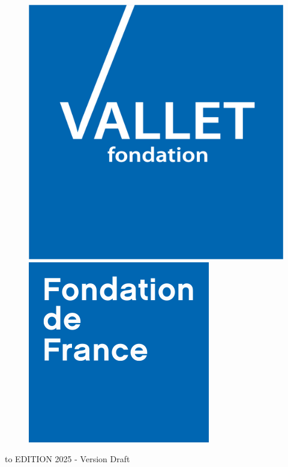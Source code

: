 \documentclass[12pt,a4paper]{article}
\begin{document}
{\begin{titlepage}
\begin{center}
   \begin{figure}[h]
    \centering
    \begin{minipage}{.45\textwidth}
    \centering
    \includegraphics[width=.7\linewidth]{../figures/logoFV.jpg}
    \end{minipage}%
    \begin{minipage}{.45\textwidth}
    \centering
    \includegraphics[width=.7\linewidth]{../figures/Fondation_de_France.png}
    \end{minipage}
    \end{figure}
    
    \vspace{0.5cm}
    

    
    \hbox to \textwidth{\hrulefill}
    \vspace{0.2cm}
    {\sc  EDITION 2025 - Version Draft}
    
  \end{center}
\end{titlepage}
}
\end{document}
